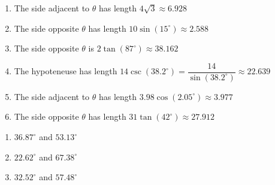 \documentclass{ximera}
\begin{document}
\begin{enumerate}

\setcounter{enumi}{\value{HW}}

\item  The side adjacent to $\theta$ has length $4\sqrt{3} \approx 6.928$

\item  The side opposite $\theta$ has length $10 \sin(15^{\circ}) \approx 2.588$

\item  The side opposite $\theta$ is $2\tan(87^{\circ}) \approx 38.162$

\item  The hypoteneuse has length $14 \csc(38.2^{\circ}) = \dfrac{14}{\sin(38.2^{\circ})} \approx 22.639$

\item  The side adjacent to $\theta$ has length $3.98 \cos(2.05^{\circ}) \approx 3.977$

\item  The side opposite $\theta$ has length $31\tan(42^{\circ}) \approx 27.912$

\setcounter{HW}{\value{enumi}}

\end{enumerate}

\begin{multicols}{3}

\begin{enumerate}

\setcounter{enumi}{\value{HW}}

\item $36.87^{\circ}$ and $53.13^{\circ}$
\item $22.62^{\circ}$ and $67.38^{\circ}$
\item $32.52^{\circ}$ and $57.48^{\circ}$

\setcounter{HW}{\value{enumi}}

\end{enumerate}

\end{multicols}
\end{document}
